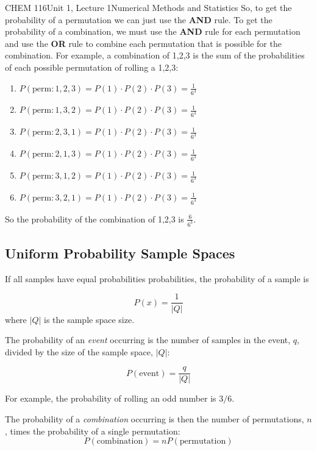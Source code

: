\documentclass{article}
\begin{document}
\begin{tdoc}{CHEM 116}{Unit 1, Lecture 1}{Numerical Methods and Statistics}
So, to get the probability of a permutation we can just use the {\bf
  AND} rule. To get the probability of a combination, we must use the
{\bf AND} rule for each permutation and use the {\bf OR} rule to
combine each permutation that is possible for the combination. For
example, a combination of 1,2,3 is the sum of the probabilities of
each possible permutation of rolling a 1,2,3:
\begin{enumerate}
\item $P(\textrm{perm}: 1,2,3) = P(1)\cdot P(2) \cdot P(3) = \frac{1}{6^3}$
\item $P(\textrm{perm}: 1,3,2) = P(1)\cdot P(2) \cdot P(3) = \frac{1}{6^3}$
\item $P(\textrm{perm}: 2,3,1) = P(1)\cdot P(2) \cdot P(3) = \frac{1}{6^3}$
\item $P(\textrm{perm}: 2,1,3) = P(1)\cdot P(2) \cdot P(3) = \frac{1}{6^3}$
\item $P(\textrm{perm}: 3,1,2) = P(1)\cdot P(2) \cdot P(3) = \frac{1}{6^3}$
\item $P(\textrm{perm}: 3,2,1) = P(1)\cdot P(2) \cdot P(3) = \frac{1}{6^3}$
\end{enumerate}
So the probability of the combination of 1,2,3 is
$\frac{6}{6^3}$.

\subsection{Uniform Probability Sample Spaces}

If all samples have equal probabilities probabilities, the probability of a
sample is

\begin{equation}
P(x) = \frac{1}{|Q|}
\end{equation}
where $|Q|$ is the sample space size.
\vspace{0.2cm}


The probability of an \emph{event} occurring is the number of samples
in the event, $q$, divided by the size of the sample space, $|Q|$:

\begin{equation}
P(\textrm{event}) = \frac{q}{|Q|}
\end{equation}

For example, the probability of rolling an odd number is $3 / 6$.


The probability of a \emph{combination} occurring is then the number of
permutations, $n$, times the probability of a single permutation:
\begin{equation}
P(\textrm{combination}) = n P(\textrm{permutation})
\end{equation}
\vspace{0.2cm}


\end{tdoc}
\end{document}

